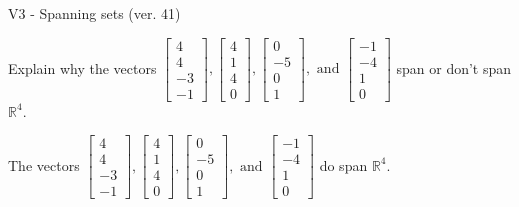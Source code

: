 \begin{exercise}
  \begin{exerciseTitle}V3 - Spanning sets (ver. 41)\end{exerciseTitle}
  \begin{exerciseStatement}
    Explain why the vectors \(\left[\begin{array}{r}
4 \\
4 \\
-3 \\
-1
\end{array}\right] , \left[\begin{array}{r}
4 \\
1 \\
4 \\
0
\end{array}\right] , \left[\begin{array}{r}
0 \\
-5 \\
0 \\
1
\end{array}\right] , \text{ and } \left[\begin{array}{r}
-1 \\
-4 \\
1 \\
0
\end{array}\right]\) span or don't span \(\mathbb{R}^4\). 
	


  \end{exerciseStatement}
  \begin{exerciseAnswer}
   The vectors \(\left[\begin{array}{r}
4 \\
4 \\
-3 \\
-1
\end{array}\right] , \left[\begin{array}{r}
4 \\
1 \\
4 \\
0
\end{array}\right] , \left[\begin{array}{r}
0 \\
-5 \\
0 \\
1
\end{array}\right] , \text{ and } \left[\begin{array}{r}
-1 \\
-4 \\
1 \\
0
\end{array}\right]\) 
  	 do  
	span \(\mathbb{R}^4\).
  


  \end{exerciseAnswer}
\end{exercise}